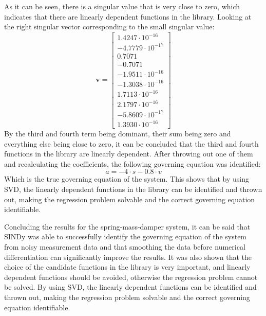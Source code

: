 ﻿\documentclass[12pt,a4paper]{article}
\begin{document}
As it can be seen, there is a singular value that is very close to zero,
which indicates that there are linearly dependent functions in the library. 
Looking at the right singular vector corresponding to the small singular value:
\begin{equation}
    \bm{v} = \begin{bmatrix}
    1.4247\cdot10^{-16} \\
    -4.7779\cdot10^{-17} \\
    0.7071 \\
    -0.7071 \\
    -1.9511\cdot10^{-16} \\
    -1.3038\cdot10^{-16} \\
    1.7113\cdot10^{-16} \\
    2.1797\cdot10^{-16} \\
    -5.8609\cdot10^{-17} \\
    1.3930\cdot10^{-16}
    \end{bmatrix}
\end{equation}
By the third and fourth term being dominant, their sum being zero and everything else being close to zero,
it can be concluded that the third and fourth functions in the library are linearly dependent.
After throwing out one of them and recalculating the coefficients, the following governing equation was identified:
\begin{equation}
    a = -4 \cdot s - 0.8 \cdot v
\end{equation}
Which is the true governing equation of the system. This shows that by using SVD, the
linearly dependent functions in the library can be identified and thrown out, 
making the regression problem solvable and the correct governing equation identifiable.\par

Concluding the results for the spring-mass-damper system, it can be said that SINDy was 
able to successfully identify the governing equation of the system from noisy measurement 
data and that smoothing the data before numerical differentiation can significantly improve 
the results. It was also shown that the choice of the candidate functions in the library is 
very important, and linearly dependent functions should be avoided, otherwise the regression 
problem cannot be solved. By using SVD, the linearly dependent functions can be identified 
and thrown out, making the regression problem solvable and the correct governing equation 
identifiable.\par
\end{document}
